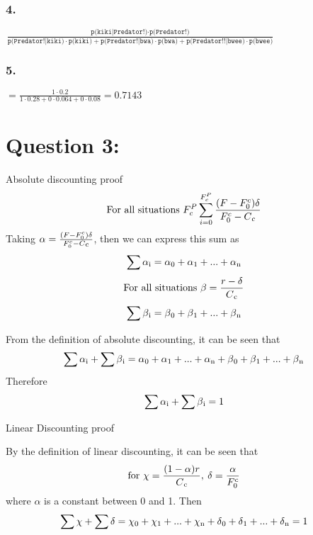 \documentclass[a4paper,12pt]{article}
\begin{document}
 \subsubsection*{4.}
 \begin{center}
 $\frac{\texttt{p(kiki|Predator!)}\cdot \texttt{p(Predator!)}}{
 \texttt{p(Predator!|kiki)}\cdot \texttt{p(kiki)} + 
 \texttt{p(Predator!|bwa)}\cdot \texttt{p(bwa)} + 
  \texttt{p(Predator!!|bwee)}\cdot \texttt{p(bwee)}}$
 \end{center}
 \subsubsection*{5.}
 \begin{center}
 $= \frac{1 \cdot 0.2}{1 \cdot 0.28 + 0 \cdot 0.064 + 0 \cdot 0.08} = 0.7143$ 
  \end{center}
  \section*{Question 3: }
  Absolute discounting proof
\begin{equation}
\textrm{For all situations }F^{P}_{c} 
 \sum^{F^{P}_{c}}_{i=0} \frac{(F-F^{c}_{0}) \delta }{F^{c}_{0}- C\textsubscript{c}}
\end{equation}
Taking $\alpha = \frac{(F-F^{c}_{0}) \delta }{F^{c}_{0}- C\textsubscript{c}}$, then we can express this sum as $$\sum \alpha\textsubscript{i} = \alpha\textsubscript{0} + \alpha\textsubscript{1} + ... + \alpha\textsubscript{n}$$
\begin{equation}
\textrm{For all situations } \beta =\frac{r - \delta }{C\textsubscript{c}}
\end{equation}
$$\sum \beta\textsubscript{i} =\beta\textsubscript{0} + \beta\textsubscript{1} + ... + \beta\textsubscript{n} $$

From the definition of absolute discounting, it can be seen that $$\sum \alpha\textsubscript{i} + \sum \beta\textsubscript{i} = \alpha\textsubscript{0} + \alpha\textsubscript{1} + ... + \alpha\textsubscript{n} + \beta\textsubscript{0} + \beta\textsubscript{1} + ... + \beta\textsubscript{n}$$
Therefore $$\sum \alpha\textsubscript{i} + \sum \beta\textsubscript{i} = 1$$

Linear Discounting proof

By the definition of linear discounting, it can be seen that$$\textrm{for } \chi =\frac{(1 - \alpha)r}{C\textsubscript{c}},\: \delta = \frac{\alpha}{F^{c}_{0}}$$ where $\alpha$ is a constant between 0 and 1. Then 
$$\sum \chi + \sum \delta = \chi\textsubscript{0} + \chi\textsubscript{1} + ... + \chi\textsubscript{n} + \delta\textsubscript{0} + \delta\textsubscript{1} + ... + \delta\textsubscript{n} = 1$$
\end{document}
